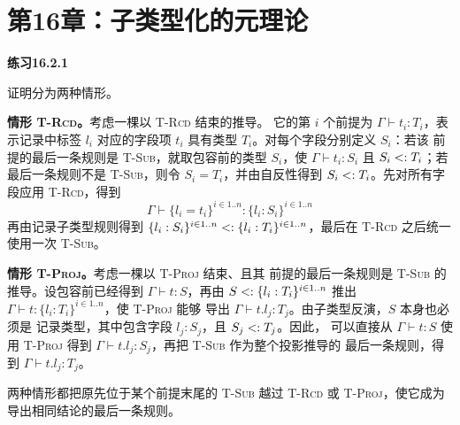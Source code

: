 \section*{第16章：子类型化的元理论}

\begin{taplsolutionentrybox}
\label{sol:translator:16.2.1}
\textbf{练习16.2.1}

证明分为两种情形。

\textbf{情形 \textsc{T-Rcd}。}考虑一棵以 \textsc{T-Rcd} 结束的推导。
它的第 \(i\) 个前提为 \(\Gamma\vdash t_i:T_i\)，表示记录中标签 \(l_i\)
对应的字段项 \(t_i\) 具有类型 \(T_i\)。对每个字段分别定义 \(S_i\)：若该
前提的最后一条规则是 \textsc{T-Sub}，就取包容前的类型 \(S_i\)，使
\(\Gamma\vdash t_i:S_i\) 且 \(S_i\mathrel{<:} T_i\)；若最后一条规则不是
\textsc{T-Sub}，则令 \(S_i=T_i\)，并由自反性得到
\(S_i\mathrel{<:} T_i\)。先对所有字段应用
\textsc{T-Rcd}，得到
\[
  \Gamma\vdash\{l_i=t_i\}^{i\in1..n}:
  \{l_i:S_i\}^{i\in1..n}
\]
再由记录子类型规则得到
\(\{l_i:S_i\}^{i\in1..n}\mathrel{<:}
  \{l_i:T_i\}^{i\in1..n}\)，最后在 \textsc{T-Rcd} 之后统一使用一次
\textsc{T-Sub}。

\textbf{情形 \textsc{T-Proj}。}考虑一棵以 \textsc{T-Proj} 结束、且其
前提的最后一条规则是 \textsc{T-Sub} 的推导。设包容前已经得到
\(\Gamma\vdash t:S\)，再由
\(S\mathrel{<:}\{l_i:T_i\}^{i\in1..n}\) 推出
\(\Gamma\vdash t:\{l_i:T_i\}^{i\in1..n}\)，使 \textsc{T-Proj} 能够
导出 \(\Gamma\vdash t.l_j:T_j\)。由子类型反演，\(S\) 本身也必须是
记录类型，其中包含字段 \(l_j:S_j\)，且 \(S_j\mathrel{<:} T_j\)。因此，
可以直接从 \(\Gamma\vdash t:S\) 使用 \textsc{T-Proj} 得到
\(\Gamma\vdash t.l_j:S_j\)，再把 \textsc{T-Sub} 作为整个投影推导的
最后一条规则，得到
\(\Gamma\vdash t.l_j:T_j\)。

两种情形都把原先位于某个前提末尾的 \textsc{T-Sub} 越过
\textsc{T-Rcd} 或 \textsc{T-Proj}，使它成为导出相同结论的最后一条规则。

\end{taplsolutionentrybox}

